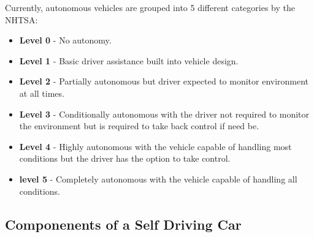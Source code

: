 Currently, autonomous vehicles are grouped into 5 different categories by the NHTSA:
\begin{itemize}
    \item \textbf{Level 0} - No autonomy. 
    \item \textbf{Level 1} - Basic driver assistance built into vehicle design.
    \item \textbf{Level 2} - Partially autonomous but driver expected to monitor environment at all times.
    \item \textbf{Level 3} - Conditionally autonomous with the driver not required to monitor the environment but is required to take back control if need be.
    \item \textbf{Level 4} - Highly autonomous with the vehicle capable of handling most conditions but the driver has the option to take control. 
    \item \textbf{level 5} - Completely autonomous with the vehicle capable of handling all conditions.
\end{itemize}






\subsection{Componenents of a Self Driving Car}

